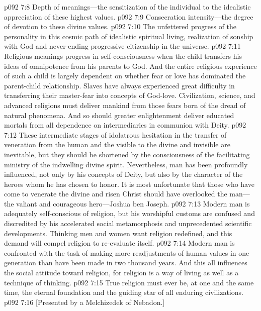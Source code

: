 \vs p092 7:8 \bibnobreakspace Depth of meanings---the sensitization of the individual to the idealistic appreciation of these highest values.
\vs p092 7:9 \bibnobreakspace Consecration intensity---the degree of devotion to these divine values.
\vs p092 7:10 \bibnobreakspace The unfettered progress of the personality in this cosmic path of idealistic spiritual living, realization of sonship with God and never\hyp{}ending progressive citizenship in the universe.
\pc \vs p092 7:11 Religious meanings progress in self\hyp{}consciousness when the child transfers his ideas of omnipotence from his parents to God. And the entire religious experience of such a child is largely dependent on whether fear or love has dominated the parent\hyp{}child relationship. Slaves have always experienced great difficulty in transferring their master\hyp{}fear into concepts of God\hyp{}love. Civilization, science, and advanced religions must deliver mankind from those fears born of the dread of natural phenomena. And so should greater enlightenment deliver educated mortals from all dependence on intermediaries in communion with Deity.
\vs p092 7:12 These intermediate stages of idolatrous hesitation in the transfer of veneration from the human and the visible to the divine and invisible are inevitable, but they should be shortened by the consciousness of the facilitating ministry of the indwelling divine spirit. Nevertheless, man has been profoundly influenced, not only by his concepts of Deity, but also by the character of the heroes whom he has chosen to honor. It is most unfortunate that those who have come to venerate the divine and risen Christ should have overlooked the man---the valiant and courageous hero---Joshua ben Joseph.
\pc \vs p092 7:13 Modern man is adequately self\hyp{}conscious of religion, but his worshipful customs are confused and discredited by his accelerated social metamorphosis and unprecedented scientific developments. Thinking men and women want religion redefined, and this demand will compel religion to re\hyp{}evaluate itself.\plusone
\vs p092 7:14 Modern man is confronted with the task of making more readjustments of human values in one generation than have been made in two thousand years. And this all influences the social attitude toward religion, for religion is a way of living as well as a technique of thinking.
\pc \vs p092 7:15 True religion must ever be, at one and the same time, the eternal foundation and the guiding star of all enduring civilizations.
\vsetoff
\vs p092 7:16 [Presented by a Melchizedek of Nebadon.]
